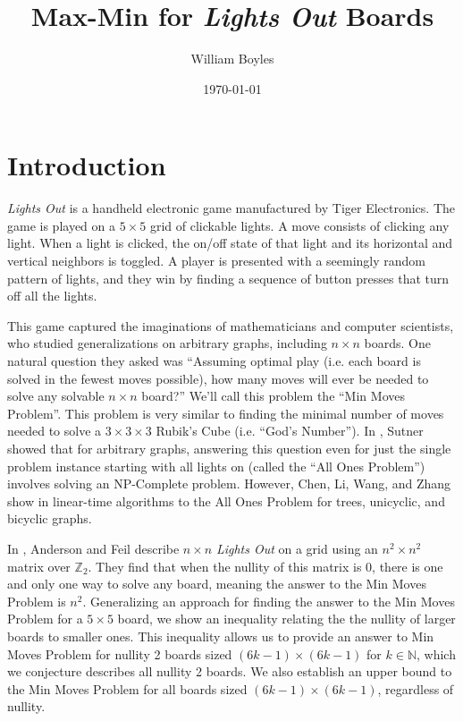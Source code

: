 \documentclass[a4paper]{article}
\newcommand{\Z}{\mathbb{Z}}
\newcommand{\N}{\mathbb{N}}
\begin{document}
	\title{Max-Min for \textit{Lights Out} Boards}
	\author{William Boyles}
	\date{\today}
	\maketitle
	
	\section{Introduction}
	\textit{Lights Out} is a handheld electronic game manufactured by Tiger Electronics.
	The game is played on a $5 \times 5$ grid of clickable lights.
	A move consists of clicking any light.
	When a light is clicked, the on/off state of that light and its horizontal and vertical neighbors is toggled.
	A player is presented with a seemingly random pattern of lights, and they win by finding a sequence of button presses that turn off all the lights.
	
	This game captured the imaginations of mathematicians and computer scientists, who studied generalizations on arbitrary graphs, including $n \times n$ boards.
	One natural question they asked was ``Assuming optimal play (i.e. each board is solved in the fewest moves possible), how many moves will ever be needed to solve any solvable $n \times n$ board?''
	We'll call this problem the ``Min Moves Problem''.
	This problem is very similar to finding the minimal number of moves needed to solve a $3 \times 3 \times 3$ Rubik's Cube (i.e. ``God's Number'').
	In \cite{Sutner1988}, Sutner showed that for arbitrary graphs, answering this question even for just the single problem instance starting with all lights on (called the ``All Ones Problem'') involves solving an NP-Complete problem.
	However, Chen, Li, Wang, and Zhang show in \cite{CHEN200493} linear-time algorithms to the All Ones Problem for trees, unicyclic, and bicyclic graphs.
	
	In \cite{anderson_feil}, Anderson and Feil describe $n \times n$ \textit{Lights Out} on a grid using an $n^2 \times n^2$ matrix over $\Z_2$.
	They find that when the nullity of this matrix is 0, there is one and only one way to solve any board, meaning the answer to the Min Moves Problem is $n^2$.
	Generalizing an approach for finding the answer to the Min Moves Problem for a $5 \times 5$ board, we show an inequality relating the the nullity of larger boards to smaller ones.
	This inequality allows us to provide an answer to Min Moves Problem for nullity 2 boards sized $(6k - 1) \times (6k - 1)$ for $k \in \N$, which we conjecture describes all nullity 2 boards.
	We also establish an upper bound to the Min Moves Problem for all boards sized $(6k - 1) \times (6k - 1)$, regardless of nullity.
	
\end{document}
